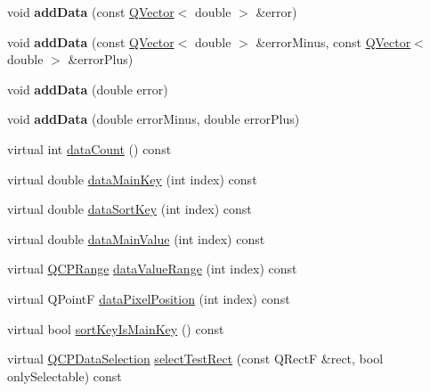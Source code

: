 \begin{DoxyCompactItemize}
\item 
\mbox{\label{class_q_c_p_error_bars_aae296ad9817b3fa418db284af81cecf8}} 
void {\bfseries add\+Data} (const \hyperlink{class_q_vector}{Q\+Vector}$<$ double $>$ \&error)
\item 
\mbox{\label{class_q_c_p_error_bars_a2135cf41d7925a3dcdadd4eb03fd3eb6}} 
void {\bfseries add\+Data} (const \hyperlink{class_q_vector}{Q\+Vector}$<$ double $>$ \&error\+Minus, const \hyperlink{class_q_vector}{Q\+Vector}$<$ double $>$ \&error\+Plus)
\item 
\mbox{\label{class_q_c_p_error_bars_a39ef73b0e61941fc4064fd3a5224c72a}} 
void {\bfseries add\+Data} (double error)
\item 
\mbox{\label{class_q_c_p_error_bars_a1833c5de9c2fe2952b977505d9f27cd1}} 
void {\bfseries add\+Data} (double error\+Minus, double error\+Plus)
\item 
virtual int \hyperlink{class_q_c_p_error_bars_ad483ac705b62f3c16dc2c6c1627d22d9}{data\+Count} () const
\item 
virtual double \hyperlink{class_q_c_p_error_bars_acdd5689cdb5562706111a55381fb9009}{data\+Main\+Key} (int index) const
\item 
virtual double \hyperlink{class_q_c_p_error_bars_a31ba7d98d805617c41c7773ae2d2886b}{data\+Sort\+Key} (int index) const
\item 
virtual double \hyperlink{class_q_c_p_error_bars_a30170b7bdbfd649e0dd7f79f9a6e62ff}{data\+Main\+Value} (int index) const
\item 
virtual \hyperlink{class_q_c_p_range}{Q\+C\+P\+Range} \hyperlink{class_q_c_p_error_bars_af3a66650bc2a36b06a7d77f879b7eb8c}{data\+Value\+Range} (int index) const
\item 
virtual Q\+PointF \hyperlink{class_q_c_p_error_bars_ac50601b6860b0801e2d127dfa5709bc8}{data\+Pixel\+Position} (int index) const
\item 
virtual bool \hyperlink{class_q_c_p_error_bars_a2e5264bcd56e516d2ce0e1bdbccb4e6c}{sort\+Key\+Is\+Main\+Key} () const
\item 
virtual \hyperlink{class_q_c_p_data_selection}{Q\+C\+P\+Data\+Selection} \hyperlink{class_q_c_p_error_bars_ab3821460f7226d80e300d4a2c9baace8}{select\+Test\+Rect} (const Q\+RectF \&rect, bool only\+Selectable) const

\end{DoxyCompactItemize}
